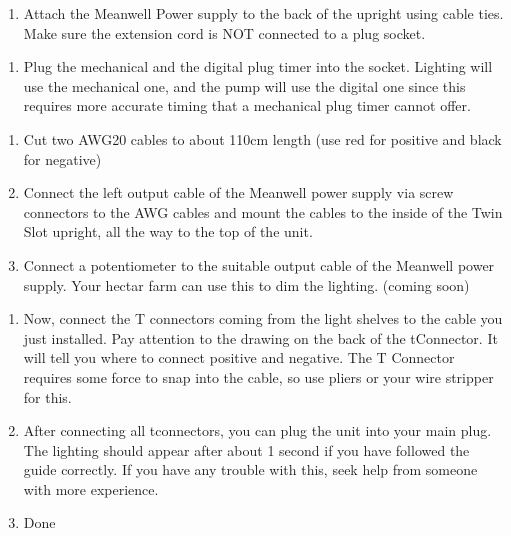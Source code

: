\documentclass[letterpaper,10pt,english]{sphinxmanual}
\begin{document}
\noindent{}
\begin{enumerate}
%
\setcounter{enumi}{1}
\item {} 
Attach the Meanwell Power supply to the back of the upright using cable ties. Make sure the extension cord is NOT connected to a plug socket.

\end{enumerate}

\noindent{}
\begin{enumerate}
%
\setcounter{enumi}{2}
\item {} 
Plug the mechanical and the digital plug timer into the socket. Lighting will use the mechanical one, and the pump will use the digital one since this requires more accurate timing that a mechanical plug timer cannot offer.

\end{enumerate}

\noindent{}
\begin{enumerate}
%
\setcounter{enumi}{3}
\item {} 
Cut two AWG20 cables to about 110cm length (use red for positive and black for negative)

\item {} 
Connect the left output cable of the Meanwell power supply via screw connectors to the AWG cables and mount the cables to the inside of the Twin Slot upright, all the way to the top of the unit.

\item {} 
Connect a potentiometer to the suitable output cable of the Meanwell power supply. Your hectar farm can use this to dim the lighting. (coming soon)

\end{enumerate}

\noindent{}
\begin{enumerate}
%
\setcounter{enumi}{6}
\item {} 
Now, connect the T connectors coming from the light shelves to the cable you just installed. Pay attention to the drawing on the back of the t\sphinxhyphen{}Connector. It will tell you where to connect positive and negative. The T Connector requires some force to snap into the cable, so use pliers or your wire stripper for this.

\item {} 
After connecting all t\sphinxhyphen{}connectors, you can plug the unit into your main plug. The lighting should appear after about 1 second if you have followed the guide correctly. If you have any trouble with this, seek help from someone with more experience.

\item {} 
Done

\end{enumerate}
\end{document}
